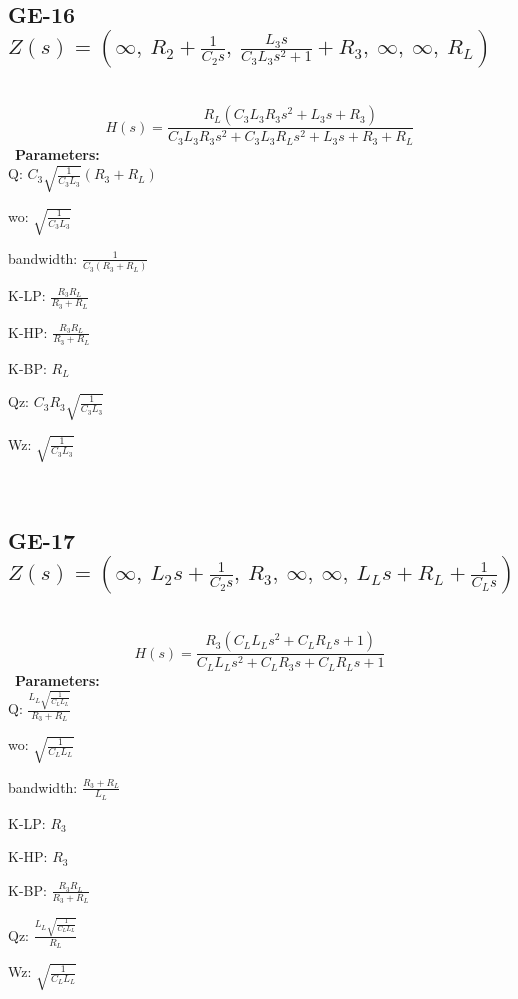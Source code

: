 \documentclass{article}
\begin{document}
\ 

\subsection{GE-16 $Z(s) = \left( \infty, \  R_{2} + \frac{1}{C_{2} s}, \  \frac{L_{3} s}{C_{3} L_{3} s^{2} + 1} + R_{3}, \  \infty, \  \infty, \  R_{L}\right)$ } \ 
\textbf{\[H(s) = \frac{R_{L} \left(C_{3} L_{3} R_{3} s^{2} + L_{3} s + R_{3}\right)}{C_{3} L_{3} R_{3} s^{2} + C_{3} L_{3} R_{L} s^{2} + L_{3} s + R_{3} + R_{L}}\] } \ 
\textbf{Parameters:}\\ 

Q: $C_{3} \sqrt{\frac{1}{C_{3} L_{3}}} \left(R_{3} + R_{L}\right)$\ 

wo: $\sqrt{\frac{1}{C_{3} L_{3}}}$\ 

bandwidth: $\frac{1}{C_{3} \left(R_{3} + R_{L}\right)}$\ 

K-LP: $\frac{R_{3} R_{L}}{R_{3} + R_{L}}$\ 

K-HP: $\frac{R_{3} R_{L}}{R_{3} + R_{L}}$\ 

K-BP: $R_{L}$\ 

Qz: $C_{3} R_{3} \sqrt{\frac{1}{C_{3} L_{3}}}$\ 

Wz: $\sqrt{\frac{1}{C_{3} L_{3}}}$\ 

\ 

\subsection{GE-17 $Z(s) = \left( \infty, \  L_{2} s + \frac{1}{C_{2} s}, \  R_{3}, \  \infty, \  \infty, \  L_{L} s + R_{L} + \frac{1}{C_{L} s}\right)$ } \ 
\textbf{\[H(s) = \frac{R_{3} \left(C_{L} L_{L} s^{2} + C_{L} R_{L} s + 1\right)}{C_{L} L_{L} s^{2} + C_{L} R_{3} s + C_{L} R_{L} s + 1}\] } \ 
\textbf{Parameters:}\\ 

Q: $\frac{L_{L} \sqrt{\frac{1}{C_{L} L_{L}}}}{R_{3} + R_{L}}$\ 

wo: $\sqrt{\frac{1}{C_{L} L_{L}}}$\ 

bandwidth: $\frac{R_{3} + R_{L}}{L_{L}}$\ 

K-LP: $R_{3}$\ 

K-HP: $R_{3}$\ 

K-BP: $\frac{R_{3} R_{L}}{R_{3} + R_{L}}$\ 

Qz: $\frac{L_{L} \sqrt{\frac{1}{C_{L} L_{L}}}}{R_{L}}$\ 

Wz: $\sqrt{\frac{1}{C_{L} L_{L}}}$\ 

\ 
\end{document}
